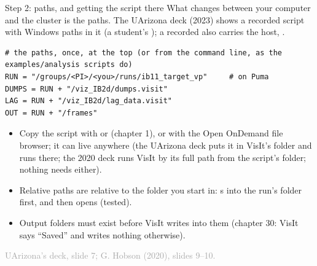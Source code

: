 \documentclass[aspectratio=169,11pt]{beamer}
\newcommand{\sourcecredit}[1]{\vfill\begin{flushright}\tiny\textcolor{DarkGray}{#1}\end{flushright}}
\begin{document}
\begin{frame}[fragile]{Step 2: paths, and getting the script there}
\label{fr:paths}
\footnotesize
What changes between your computer and the cluster is the paths. The UArizona deck (2023) shows a recorded script with Windows paths in it (a student's ); a recorded  also carries the host, .
\begin{lstlisting}[style=python]
# the paths, once, at the top (or from the command line, as the examples/analysis scripts do)
RUN = "/groups/<PI>/<you>/runs/ib11_target_vp"     # on Puma
DUMPS = RUN + "/viz_IB2d/dumps.visit"
LAG = RUN + "/viz_IB2d/lag_data.visit"
OUT = RUN + "/frames"
\end{lstlisting}
\begin{itemize}\setlength{\itemsep}{1pt}
  \item Copy the script with  or  (chapter 1), or with the Open OnDemand file browser; it can live anywhere (the UArizona deck puts it in VisIt's  folder and runs  there; the 2020 deck runs VisIt by its full path from the script's folder; nothing needs either).
  \item Relative paths are relative to the folder you start  in:  s into the run's folder first, and  then opens (tested).
  \item Output folders must exist before VisIt writes into them (chapter 30: VisIt says ``Saved'' and writes nothing otherwise).
\end{itemize}
\sourcecredit{UArizona's deck, slide 7; G. Hobson (2020), slides 9--10.}
\end{frame}
\end{document}
